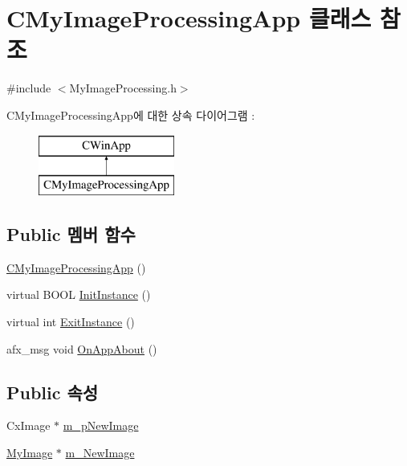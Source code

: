 \hypertarget{class_c_my_image_processing_app}{\section{C\-My\-Image\-Processing\-App 클래스 참조}
\label{class_c_my_image_processing_app}
}


{\ttfamily \#include $<$My\-Image\-Processing.\-h$>$}

C\-My\-Image\-Processing\-App에 대한 상속 다이어그램 \-: \begin{figure}[H]
\begin{center}
\leavevmode
\includegraphics[height=2.000000cm]{class_c_my_image_processing_app}
\end{center}
\end{figure}
\subsection*{Public 멤버 함수}
\begin{DoxyCompactItemize}
\item 
\hyperlink{class_c_my_image_processing_app_ad1f80d98d11ebd682d96f4f242a1ac8e}{C\-My\-Image\-Processing\-App} ()
\item 
virtual B\-O\-O\-L \hyperlink{class_c_my_image_processing_app_a39dbd1c72587d475ba844ace08463174}{Init\-Instance} ()
\item 
virtual int \hyperlink{class_c_my_image_processing_app_aa9f926c482433d072c7594667a685fef}{Exit\-Instance} ()
\item 
afx\-\_\-msg void \hyperlink{class_c_my_image_processing_app_ad29a277fd0fba00c3fd4dfecc47a2eca}{On\-App\-About} ()
\end{DoxyCompactItemize}
\subsection*{Public 속성}
\begin{DoxyCompactItemize}
\item 
Cx\-Image $\ast$ \hyperlink{class_c_my_image_processing_app_ad42155c6a3d9aad19b57bb15a06ddda9}{m\-\_\-p\-New\-Image}
\item 
\hyperlink{class_my_image}{My\-Image} $\ast$ \hyperlink{class_c_my_image_processing_app_aa5a25236bb1a996bb2c86864d54fba25}{m\-\_\-\-New\-Image}
\end{DoxyCompactItemize}


